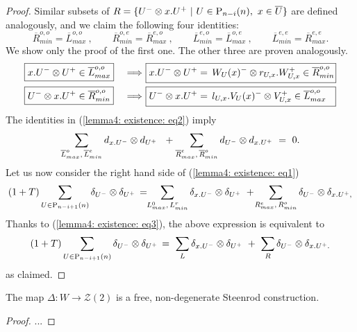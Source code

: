 \begin{proof}
	\vspace*{5pt}
	Similar subsets of $R = \{U^-\otimes x.U^+\ | \ U \in \mathrm{P}_{n-i}(n),\ x \in \overline{U}\}$ are defined analogously, and we claim the following four identities:
	\begin{equation}\label{lemma4: existence: eq2}
	\overline{R}_{min}^{o,o} = \overline{L}_{max}^{o,o}\ , \qquad \overline{R}_{min}^{o,e} = \overline{R}_{max}^{e,o}\ , \qquad
	\overline{L}_{min}^{e,o} = \overline{L}_{max}^{o,e}\ , \qquad \overline{L}_{min}^{e,e} = \overline{R}_{max}^{e,e}.
	\end{equation}
	We show only the proof of the first one. The other three are proven analogously.
	\begin{alignat*}{2}
	&\boxed{x.U^-\tensor U^+ \in \overline{L}_{max}^{o,o}}\ &\Longrightarrow\ &\boxed{x.U^-\tensor U^+ =\, W_U(x)^-\tensor r_{U,x}.W_{U,x}^+ \in \overline{R}_{min}^{o,o} \! } \\
	&\boxed{U^-\tensor x.U^+ \in \overline{R}_{min}^{o,o}}\ &\Longrightarrow\ &\boxed{U^-\tensor x.U^+ =\, l_{U,x}.V_U(x)^-\tensor V_{U,x}^+ \in \overline{L}_{max}^{o,o} \ \ }
	\end{alignat*}
	The identities in (\ref{lemma4: existence: eq2}) imply
	\begin{equation} \label{lemma4: existence: eq3}
	\sum_{\overline{L}_{max}^{o},\, \overline{L}_{min}^{e}} d_{x.U^-} \otimes d_{U^+}\ \ +
	\sum_{\overline{R}_{max}^{e},\, \overline{R}_{min}^{o}} d_{U^-} \otimes d_{x.U^+}\ =\ 0.
	\end{equation}
	Let us now consider the right hand side of (\ref{lemma4: existence: eq1})
	\[
	(1+T) \sum_{U \in \mathrm{P}_{n-i+1}(n)} \delta_{U^-} \otimes \delta_{U^+} \, = \!\!
	\sum_{L^0_{max},\, L^r_{min}} \delta_{x.U^-} \otimes \delta_{U^+}\ + \!
	\sum_{R^e_{max}, \, R^o_{min}} \delta_{U^-} \otimes \delta_{x.U^+,}
	\]
	Thanks to (\ref{lemma4: existence: eq3}), the above expression is equivalent to
	\[
	(1+T) \sum_{U \in \mathrm{P}_{n-i+1}(n)} \delta_{U^-} \otimes \delta_{U^+} \, = \
	\sum_{L} \delta_{x.U^-} \otimes \delta_{U^+}\ + \
	\sum_{R} \delta_{U^-} \otimes \delta_{x.U^+.}
	\]
	as claimed.
\end{proof}

\begin{corollary}
	The map $\Delta \colon W \to \mathcal Z(2)$ is a free, non-degenerate Steenrod construction.
\end{corollary}

\begin{proof}
	...
\end{proof}

